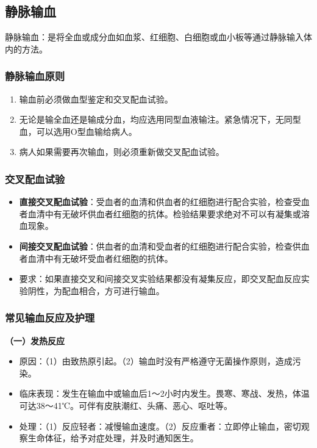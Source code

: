 \documentclass[11pt, a4paper]{ctexart}
\begin{document}
\subsection{静脉输血}
静脉输血：是将全血或成分血如血浆、红细胞、白细胞或血小板等通过静脉输入体内的方法。

\subsubsection{静脉输血原则}
\begin{enumerate}
    \item 输血前必须做血型鉴定和交叉配血试验。
    \item 无论是输全血还是输成分血，均应选用同型血液输注。紧急情况下，无同型血，可以选用O型血输给病人。
    \item 病人如果需要再次输血，则必须重新做交叉配血试验。
\end{enumerate}

\subsubsection{交叉配血试验}
\begin{itemize}
    \item \textbf{直接交叉配血试验}：受血者的血清和供血者的红细胞进行配合实验，检查受血者血清中有无破坏供血者红细胞的抗体。检验结果要求绝对不可以有凝集或溶血现象。
    \item \textbf{间接交叉配血试验}：供血者的血清和受血者的红细胞进行配合实验，检查供血者血清中有无破坏受血者红细胞的抗体。
    \item 要求：如果直接交叉和间接交叉实验结果都没有凝集反应，即交叉配血反应实验阴性，为配血相合，方可进行输血。
\end{itemize}

\subsubsection{常见输血反应及护理}
\textbf{（一）发热反应}
\begin{itemize}
    \item 原因：（1）由致热原引起。（2）输血时没有严格遵守无菌操作原则，造成污染。
    \item 临床表现：发生在输血中或输血后1～2小时内发生。畏寒、寒战、发热，体温可达38～41℃。可伴有皮肤潮红、头痛、恶心、呕吐等。
    \item 处理：（1）反应轻者：减慢输血速度。（2）反应重者：立即停止输血，密切观察生命体征，给予对症处理，并及时通知医生。
\end{itemize}
\end{document}
